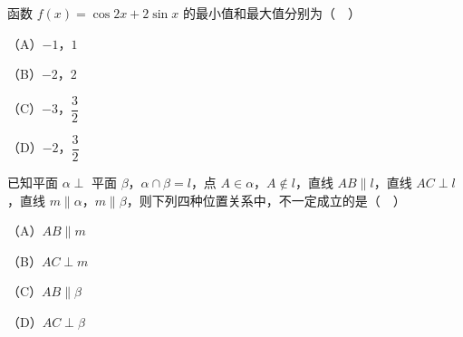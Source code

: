 \begin{question}
函数 $f(x)=\cos2x+2\sin x$ 的最小值和最大值分别为（　）

（A）$-1$，$1$

（B）$-2$，$2$

（C）$-3$，$\dfrac32$

（D）$-2$，$\dfrac32$

\end{question}
\begin{question}
已知平面 $\alpha\perp$ 平面 $\beta$，$\alpha\cap\beta=l$，点 $A\in\alpha$，$A\notin l$，直线 $AB\parallel l$，直线 $AC\perp l$，直线 $m\parallel\alpha$，$m\parallel\beta$，则下列四种位置关系中，不一定成立的是（　）

（A）$AB\parallel m$

（B）$AC\perp m$

（C）$AB\parallel\beta$

（D）$AC\perp\beta$

\end{question}

